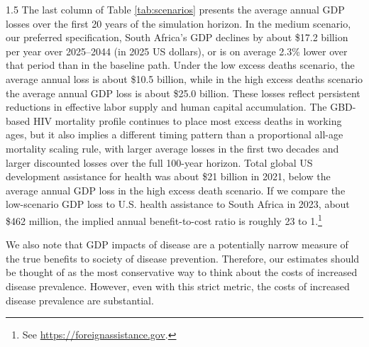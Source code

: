 \documentclass[letterpaper,12pt]{article}
\theoremstyle{definition}
\begin{document}
\begin{spacing}{1.5}
The last column of Table \ref{tab:scenarios} presents the average annual GDP losses over the first 20 years of the simulation horizon. In the medium scenario, our preferred specification, South Africa's GDP declines by about \$17.2 billion per year over 2025--2044 (in 2025 US dollars), or is on average 2.3\% lower over that period than in the baseline path. Under the low excess deaths scenario, the average annual loss is about \$10.5 billion, while in the high excess deaths scenario the average annual GDP loss is about \$25.0 billion. These losses reflect persistent reductions in effective labor supply and human capital accumulation. The GBD-based HIV mortality profile continues to place most excess deaths in working ages, but it also implies a different timing pattern than a proportional all-age mortality scaling rule, with larger average losses in the first two decades and larger discounted losses over the full 100-year horizon. Total global US development assistance for health was about \$21 billion in 2021, below the average annual GDP loss in the high excess death scenario. If we compare the low-scenario GDP loss to U.S. health assistance to South Africa in 2023, about \$462 million, the implied annual benefit-to-cost ratio is roughly 23 to 1.\footnote{See \href{https://foreignassistance.gov}{https://foreignassistance.gov}.}

We also note that GDP impacts of disease are a potentially narrow measure of the true benefits to society of disease prevention. Therefore, our estimates should be thought of as the most conservative way to think about the costs of increased disease prevalence. However, even with this strict metric, the costs of increased disease prevalence are substantial.


\end{spacing}
\end{document}
